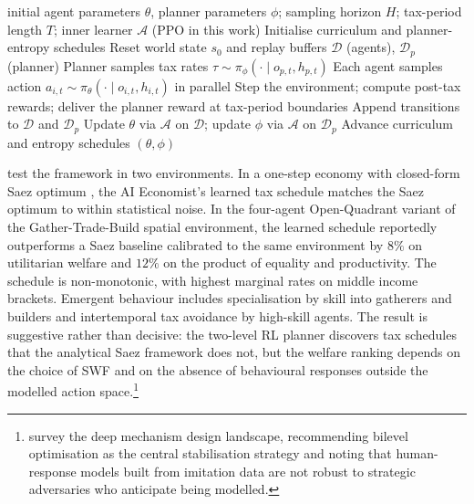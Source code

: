 \begin{algorithm}[t]
\caption{Two-level Reinforcement Learning, after \citet{Zheng2022aie}}
\label{alg:macro:aie}
\begin{algorithmic}[1]
\Require initial agent parameters $\theta$, planner parameters $\phi$; sampling horizon $H$; tax-period length $T$; inner learner $\mathcal{A}$ (PPO in this work)
\State Initialise curriculum and planner-entropy schedules
  \State Reset world state $s_0$ and replay buffers $\mathcal{D}$ (agents), $\mathcal{D}_p$ (planner)
      \State Planner samples tax rates $\tau \sim \pi_\phi(\cdot \mid o_{p,t}, h_{p,t})$
    \EndIf
    \State Each agent samples action $a_{i,t} \sim \pi_\theta(\cdot \mid o_{i,t}, h_{i,t})$ in parallel
    \State Step the environment; compute post-tax rewards; deliver the planner reward at tax-period boundaries
    \State Append transitions to $\mathcal{D}$ and $\mathcal{D}_p$
  \EndFor
  \State Update $\theta$ via $\mathcal{A}$ on $\mathcal{D}$; update $\phi$ via $\mathcal{A}$ on $\mathcal{D}_p$
  \State Advance curriculum and entropy schedules
\EndWhile
\State \Return $(\theta, \phi)$
\end{algorithmic}
\end{algorithm}

\citet{Zheng2022aie} test the framework in two environments. In a
one-step economy with closed-form Saez optimum \citep{Saez2001}, the
AI Economist's learned tax schedule matches the Saez optimum to
within statistical noise. In the four-agent Open-Quadrant variant of
the Gather-Trade-Build spatial environment, the learned schedule
reportedly outperforms a Saez baseline calibrated to the same
environment by $8\%$ on utilitarian welfare and $12\%$ on the product
of equality and productivity. The schedule is non-monotonic, with
highest marginal rates on middle income brackets. Emergent behaviour
includes specialisation by skill into gatherers and builders and
intertemporal tax avoidance by high-skill agents. The result is
suggestive rather than decisive: the two-level RL planner discovers
tax schedules that the analytical Saez framework does not, but the
welfare ranking depends on the choice of SWF and on the absence of
behavioural responses outside the modelled action
space.\footnote{\citet{Tacchetti2025dmd} survey the deep mechanism
design landscape, recommending bilevel optimisation as the central
stabilisation strategy and noting that human-response models built
from imitation data are not robust to strategic adversaries who
anticipate being modelled.}

